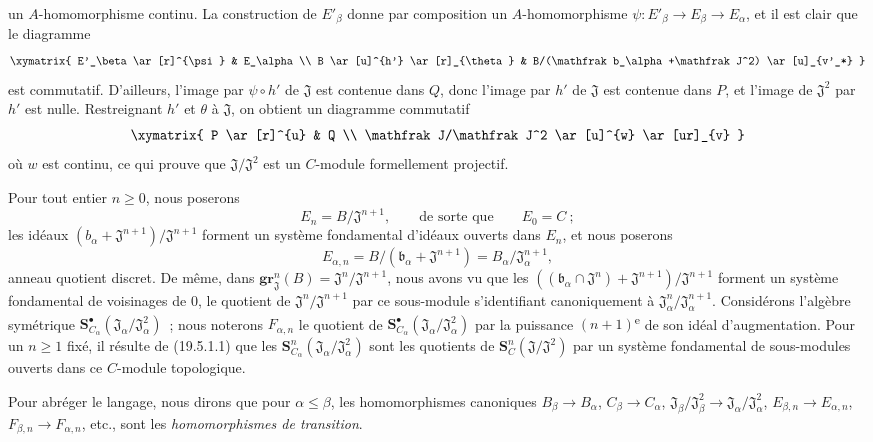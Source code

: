 \begin{env}[19.5.6.1]
un $A$-homomorphisme continu. La construction de $E'_\beta$ donne par
composition un $A$-homomorphisme $\psi:E'_\beta\to E_\beta\to E_\alpha$, et
il est clair que le diagramme
\[
  \xymatrix{
    E'_\beta \ar[r]^{\psi} & E_\alpha \\
    B \ar[u]^{h'} \ar[r]_{\theta} &
    B/(\mathfrak b_\alpha+\mathfrak J^2) \ar[u]_{v'_*}
  }
\]
est commutatif. D'ailleurs, l'image par $\psi\circ h'$ de $\mathfrak J$ est
contenue dans $Q$, donc l'image par $h'$ de $\mathfrak J$ est contenue dans
$P$, et l'image de $\mathfrak J^2$ par $h'$ est nulle. Restreignant $h'$ et
$\theta$ à $\mathfrak J$, on obtient un diagramme commutatif
\[
  \xymatrix{
    P \ar[r]^{u} & Q \\
    \mathfrak J/\mathfrak J^2 \ar[u]^{w} \ar[ur]_{v}
  }
\]
où $w$ est continu, ce qui prouve que
$\mathfrak J/\mathfrak J^2$ est un $C$-module formellement projectif.
\end{env}

\begin{env}[19.5.6.2]
\label{0.19.5.6.2-fr}
Pour tout entier $n\geq0$, nous poserons
\[
  E_n=B/\mathfrak J^{n+1},
  \qquad\text{de sorte que}\qquad E_0=C~;
\]
les idéaux $(b_\alpha+\mathfrak J^{n+1})/\mathfrak J^{n+1}$ forment
un système fondamental d'idéaux ouverts dans $E_n$, et nous poserons
\[
  E_{\alpha,n}=B/(\mathfrak b_\alpha+\mathfrak J^{n+1})
  =B_\alpha/\mathfrak J_\alpha^{n+1},
\]
anneau quotient discret. De même, dans
$\mathbf{gr}_{\mathfrak J}^n(B)=\mathfrak J^n/\mathfrak J^{n+1}$, nous avons vu que les
$((\mathfrak b_\alpha\cap\mathfrak J^n)+\mathfrak J^{n+1})/
\mathfrak J^{n+1}$ forment un système fondamental de voisinages de $0$, le
quotient de $\mathfrak J^n/\mathfrak J^{n+1}$ par ce sous-module s'identifiant
canoniquement à $\mathfrak J_\alpha^n/\mathfrak J_\alpha^{n+1}$. Considérons
l'algèbre symétrique
$\mathbf S_{C_\alpha}^\bullet(\mathfrak J_\alpha/\mathfrak J_\alpha^2)$~; nous
noterons $F_{\alpha,n}$ le quotient de
$\mathbf S_{C_\alpha}^\bullet(\mathfrak J_\alpha/\mathfrak J_\alpha^2)$ par la
puissance $(n+1)$\textsuperscript{e} de son idéal d'augmentation. Pour un $n\geq1$ fixé, il
résulte de (19.5.1.1) que les
$\mathbf S_{C_\alpha}^n(\mathfrak J_\alpha/\mathfrak J_\alpha^2)$ sont les
quotients de $\mathbf S_C^n(\mathfrak J/\mathfrak J^2)$ par un système
fondamental de sous-modules ouverts dans ce $C$-module topologique.

Pour abréger le langage, nous dirons que pour $\alpha\leq\beta$, les
homomorphismes canoniques $B_\beta\to B_\alpha$, $C_\beta\to C_\alpha$,
$\mathfrak J_\beta/\mathfrak J_\beta^2\to
\mathfrak J_\alpha/\mathfrak J_\alpha^2$, $E_{\beta,n}\to E_{\alpha,n}$,
$F_{\beta,n}\to F_{\alpha,n}$, etc., sont les \emph{homomorphismes de
transition}.
\end{env}

